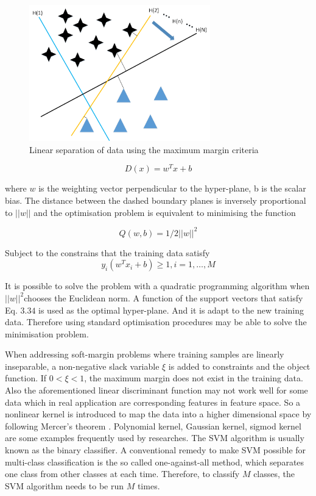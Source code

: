   
\begin{figure}[htb!]
\centering
\includegraphics[width=0.7\textwidth]{image/Method/SVM.png}
\caption[A SVM classifier]{Linear separation of data using the maximum margin criteria}
\label{fig:SVM_b}
\end{figure}
  
  
\begin{equation}
D(x)=w^{T}x+b   
\end{equation}  
    
  

where $w$ is the weighting vector perpendicular to the hyper-plane, b is the scalar bias. The distance between the dashed boundary planes is inversely proportional to $||w||$ and the optimisation problem is equivalent to minimising the function

\begin{equation}
Q(w,b)=1/2||w||^{2} 
\end{equation}

Subject to the constrains that the training data satisfy
\begin{equation}
y_{i}(w^{T}x_{i}+b) \geq 1, i=1,…,M 
\end{equation}



It is possible to solve the problem with a quadratic programming algorithm when $||w||^{2}$chooses the Euclidean norm. A function of the support vectors that satisfy Eq. $3.34$ is used as the optimal hyper-plane. And it is adapt to the new training data. Therefore using standard optimisation procedures may be able to solve the minimisation problem. 

When addressing soft-margin problems where training samples are linearly inseparable, a non-negative slack variable $\xi$ is added to constraints and the object function. If $0< \xi <1$, the maximum margin does not exist in the training data. Also the aforementioned linear discriminant function may not work well for some data which in real application are corresponding features in feature space. So a nonlinear kernel is introduced to map the data into a higher dimensional space by following Mercer’s theorem \citep{burges1998tutorial}. Polynomial kernel, Gaussian kernel, sigmod kernel are some examples frequently used by researches.
The SVM algorithm is usually known as the binary classifier. A conventional remedy to make SVM possible for multi-class classification is the so called one-against-all method, which separates one class from other classes at each time. Therefore, to classify $M$ classes, the SVM algorithm needs to be run $M$ times. 


